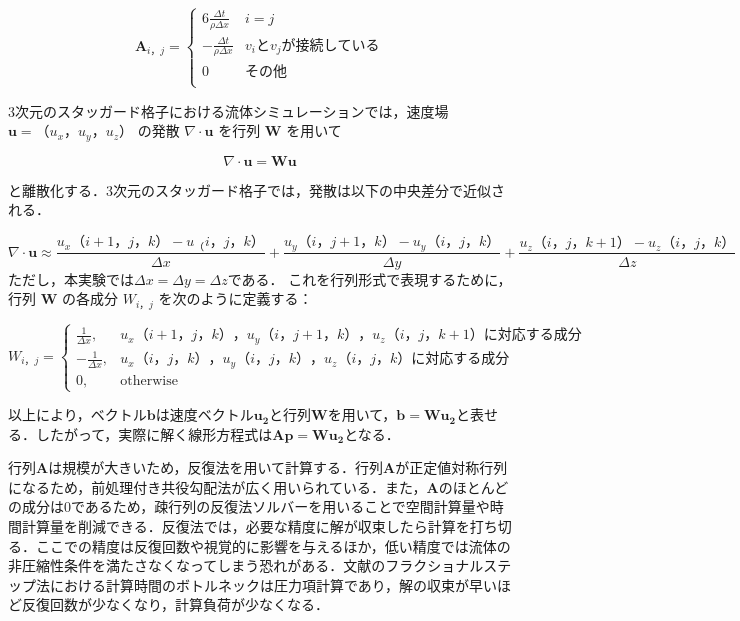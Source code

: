 \documentclass[a4j,12pt]{jreport}
\begin{document}
\[
	\mathbf{A}_{i，j} = 
	\begin{cases}
 	6\frac{\varDelta t}{\rho \varDelta x} 	& i = j\\
 	-\frac{\varDelta t}{\rho \varDelta x}   	& v_iとv_jが接続している\\
 	0  							& その他\\
	\end{cases}
\]

3次元のスタッガード格子における流体シミュレーションでは，速度場 $\mathbf{u} = （u_x，u_y，u_z）
$ の発散 $\nabla \cdot \mathbf{u}$ を行列 $\mathbf{W}$ を用いて

\[
\nabla \cdot \mathbf{u} = \mathbf{W} \mathbf{u}
\]

と離散化する．3次元のスタッガード格子では，発散は以下の中央差分で近似される．

\[
\nabla \cdot \mathbf{u} \approx \frac{u_x（i+1，j，k） - u_（i，j，k）}{\varDelta x} + \frac{u_y（i，j+1，k）- u_y（i，j，k）}{\varDelta y} + \frac{u_z（i，j，k+1） - u_z（i，j，k）}{\varDelta z}
\]
ただし，本実験では$\varDelta x = \varDelta y= \varDelta z$である．
これを行列形式で表現するために，行列 $\mathbf{W}$ の各成分 $W_{i，j}$ を次のように定義する：

\begin{equation}
W_{i，j} =
\begin{cases}
\frac{1}{\varDelta x}, &  u_x（i+1，j，k），u_y（i，j+1，k），u_z（i，j，k+1）に対応する成分 \\
-\frac{1}{\varDelta x}, & u_x（i，j，k），u_y（i，j，k），u_z（i，j，k）に対応する成分\\
0, & \text{otherwise}
\end{cases}
\end{equation}

以上により，ベクトル$\bm{b}$は速度ベクトル$\bm{u_2}$と行列$\mathbf{W}$を用いて，$\bm{b} = \mathbf{W}\bm{u_2}$と表せる．したがって，実際に解く線形方程式は$\mathbf{A}\bm{p} = \mathbf{W}\bm{u_2}$となる．

行列$\bm{A}$は規模が大きいため，反復法を用いて計算する．行列$\mathbf{A}$が正定値対称行列になるため，前処理付き共役勾配法が広く用いられている．また，$\mathbf{A}$のほとんどの成分は$0$であるため，疎行列の反復法ソルバーを用いることで空間計算量や時間計算量を削減できる．反復法では，必要な精度に解が収束したら計算を打ち切る．ここでの精度は反復回数や視覚的に影響を与えるほか，低い精度では流体の非圧縮性条件を満たさなくなってしまう恐れがある．文献\cite{fedkiw}のフラクショナルステップ法における計算時間のボトルネックは圧力項計算であり，解の収束が早いほど反復回数が少なくなり，計算負荷が少なくなる．
\end{document}
